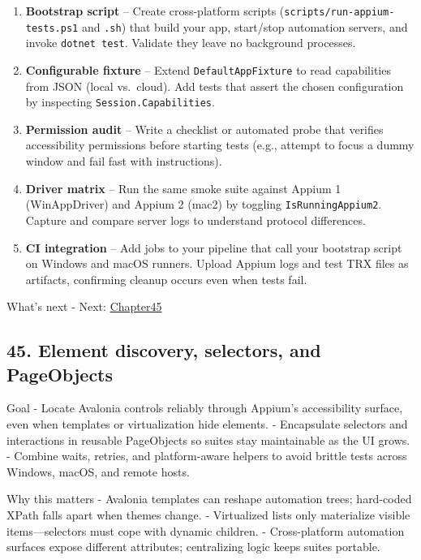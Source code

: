 \begin{enumerate}
\def\labelenumi{\arabic{enumi}.}
\tightlist
\item
  \textbf{Bootstrap script} -- Create cross-platform scripts
  (\passthrough{\lstinline!scripts/run-appium-tests.ps1!} and
  \passthrough{\lstinline!.sh!}) that build your app, start/stop
  automation servers, and invoke \passthrough{\lstinline!dotnet test!}.
  Validate they leave no background processes.
\item
  \textbf{Configurable fixture} -- Extend
  \passthrough{\lstinline!DefaultAppFixture!} to read capabilities from
  JSON (local vs.~cloud). Add tests that assert the chosen configuration
  by inspecting \passthrough{\lstinline!Session.Capabilities!}.
\item
  \textbf{Permission audit} -- Write a checklist or automated probe that
  verifies accessibility permissions before starting tests (e.g.,
  attempt to focus a dummy window and fail fast with instructions).
\item
  \textbf{Driver matrix} -- Run the same smoke suite against Appium 1
  (WinAppDriver) and Appium 2 (mac2) by toggling
  \passthrough{\lstinline!IsRunningAppium2!}. Capture and compare server
  logs to understand protocol differences.
\item
  \textbf{CI integration} -- Add jobs to your pipeline that call your
  bootstrap script on Windows and macOS runners. Upload Appium logs and
  test TRX files as artifacts, confirming cleanup occurs even when tests
  fail.
\end{enumerate}

What's next - Next: \href{Chapter45.md}{Chapter45}

\newpage

\subsection{45. Element discovery, selectors, and
PageObjects}\label{element-discovery-selectors-and-pageobjects}

Goal - Locate Avalonia controls reliably through Appium's accessibility
surface, even when templates or virtualization hide elements. -
Encapsulate selectors and interactions in reusable PageObjects so suites
stay maintainable as the UI grows. - Combine waits, retries, and
platform-aware helpers to avoid brittle tests across Windows, macOS, and
remote hosts.

Why this matters - Avalonia templates can reshape automation trees;
hard-coded XPath falls apart when themes change. - Virtualized lists
only materialize visible items---selectors must cope with dynamic
children. - Cross-platform automation surfaces expose different
attributes; centralizing logic keeps suites portable.

